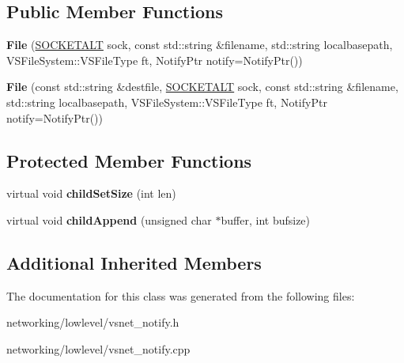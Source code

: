 \subsection*{Public Member Functions}
\begin{DoxyCompactItemize}
\item 
{\bfseries File} (\hyperlink{classSOCKETALT}{S\+O\+C\+K\+E\+T\+A\+LT} sock, const std\+::string \&filename, std\+::string localbasepath, V\+S\+File\+System\+::\+V\+S\+File\+Type ft, Notify\+Ptr notify=Notify\+Ptr())\hypertarget{classVsnetDownload_1_1Client_1_1File_a7b776ae4417c1d3271a85500afc60398}{}\label{classVsnetDownload_1_1Client_1_1File_a7b776ae4417c1d3271a85500afc60398}

\item 
{\bfseries File} (const std\+::string \&destfile, \hyperlink{classSOCKETALT}{S\+O\+C\+K\+E\+T\+A\+LT} sock, const std\+::string \&filename, std\+::string localbasepath, V\+S\+File\+System\+::\+V\+S\+File\+Type ft, Notify\+Ptr notify=Notify\+Ptr())\hypertarget{classVsnetDownload_1_1Client_1_1File_a628918b95c87ddc483700e077c08bfb7}{}\label{classVsnetDownload_1_1Client_1_1File_a628918b95c87ddc483700e077c08bfb7}

\end{DoxyCompactItemize}
\subsection*{Protected Member Functions}
\begin{DoxyCompactItemize}
\item 
virtual void {\bfseries child\+Set\+Size} (int len)\hypertarget{classVsnetDownload_1_1Client_1_1File_a5e8e1f2f5c7c43c8769ff00c9ec522e9}{}\label{classVsnetDownload_1_1Client_1_1File_a5e8e1f2f5c7c43c8769ff00c9ec522e9}

\item 
virtual void {\bfseries child\+Append} (unsigned char $\ast$buffer, int bufsize)\hypertarget{classVsnetDownload_1_1Client_1_1File_a7205646748896c077d0a6d2d85b8806d}{}\label{classVsnetDownload_1_1Client_1_1File_a7205646748896c077d0a6d2d85b8806d}

\end{DoxyCompactItemize}
\subsection*{Additional Inherited Members}


The documentation for this class was generated from the following files\+:\begin{DoxyCompactItemize}
\item 
networking/lowlevel/vsnet\+\_\+notify.\+h\item 
networking/lowlevel/vsnet\+\_\+notify.\+cpp\end{DoxyCompactItemize}
